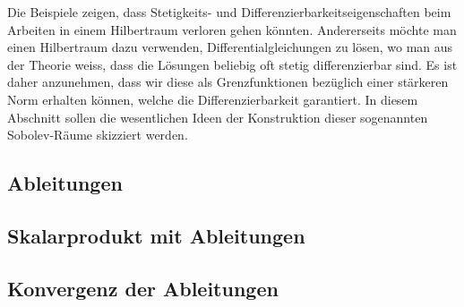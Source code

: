 Die Beispiele zeigen, dass Stetigkeits- und Differenzierbarkeitseigenschaften
beim Arbeiten in einem Hilbertraum verloren gehen könnten.
Andererseits möchte man einen Hilbertraum dazu verwenden,
Differentialgleichungen zu lösen, wo man aus der Theorie weiss, dass
die Lösungen beliebig oft stetig differenzierbar sind.
Es ist daher anzunehmen, dass wir diese als Grenzfunktionen bezüglich
einer stärkeren Norm erhalten können, welche die Differenzierbarkeit
garantiert.
In diesem Abschnitt sollen die wesentlichen Ideen der Konstruktion
dieser sogenannten Sobolev-Räume skizziert werden.

%
%
\subsection{Ableitungen}

%
%
\subsection{Skalarprodukt mit Ableitungen}

%
%
\subsection{Konvergenz der Ableitungen}






